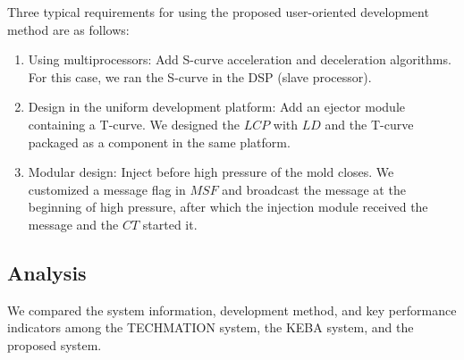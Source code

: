 \documentclass[journal,UTF8]{IEEEtran}
\begin{document}
Three typical requirements for using the proposed user-oriented development method are as follows:
\begin{enumerate}
	\item Using multiprocessors: Add S-curve acceleration and deceleration algorithms. For this case, we ran the S-curve in the DSP (slave processor).
	\item Design in the uniform development platform: Add an ejector module containing a T-curve. We designed the $LCP$ with $LD$ and the T-curve packaged as a component in the same platform.
	\item Modular design: Inject before high pressure of the mold closes. We customized a message flag in $MSF$ and broadcast the message at the beginning of high pressure, after which the injection module received the message and the $CT$ started it.
\end{enumerate}
\subsection{Analysis}
We compared the system information, development method, and key performance indicators among the TECHMATION system, the KEBA system, and the proposed system.
\end{document}
